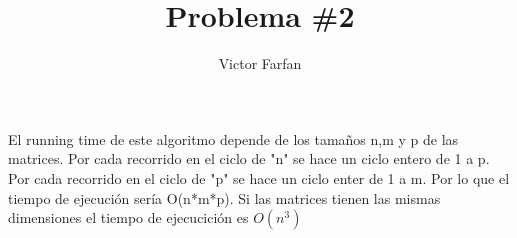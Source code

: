 \documentclass{article}
\begin{document}
\title{Problema \#2}
\author{Victor Farfan}
\maketitle
	\begin{algorithm}[H]
	\newline
	\end{algorithm}
	
\newenvironment{answer}
\begin{answer}
	
El running time de este algoritmo depende de los tamaños n,m y p de las matrices. Por cada recorrido en el ciclo de "n" se hace un ciclo entero de 1 a p. Por cada recorrido en el ciclo de "p" se hace un ciclo enter de 1 a m. Por lo que el tiempo de ejecución sería O(n*m*p). Si las matrices tienen las mismas dimensiones el tiempo de ejecucición es \begin{math} O(n^{3}) \end{math}
\end{document}

